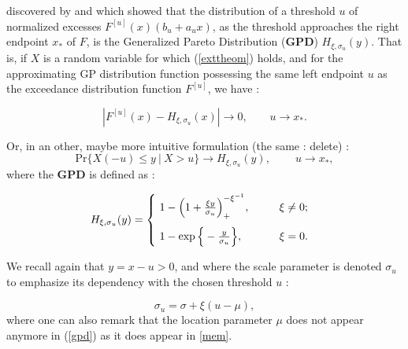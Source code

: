 \begin{theorem}
	discovered by \emph{\cite{balkema_residual_1974}} and\emph{\cite{iii_statistical_1975-1}}
	which showed that the distribution of a threshold $u$ of normalized excesses $F^{[u]}(x)(b_u+a_ux)$, as the threshold approaches the right endpoint $x_*$ of $F$, is the Generalized Pareto Distribution (\textbf{GPD}) $H_{\xi,\sigma_u}(y)$. That is, if $X$ is a random variable for which (\ref{exttheom}) holds, and for the approximating GP distribution function possessing the same left endpoint $u$ as the exceedance distribution function $F^{[u]}$, we have \emph{\citet[pp.27]{reiss_statistical_2007}}: 
	
	\begin{equation*}
	|F^{[u]}(x)-H_{\xi,\sigma_u}(x)|\longrightarrow 0, \ \ \ \ \ \ \ \ \ u\to x_*.
	\end{equation*}
\end{theorem}
Or, in an other, maybe more intuitive formulation (the same : delete) \cite{coles_introduction_2001} :
\begin{equation} \label{gpdconv}
\text{Pr}\big\{X(-u)\leq y\ |\ X>u\big\}\longrightarrow H_{\xi,\sigma_u}(y), \ \ \ \ \ \ \ \ \ \ u\to x_*,
\end{equation}
where the \textbf{GPD} is defined as :


\begin{equation}\label{gpdeq}
H_{\xi,\sigma_u}(y)=
\renewcommand{\arraystretch}{0.6}\left\{\begin{array}{@{}l@{\quad}l@{}}
\ 1-\Big(1+\frac{\xi y}{\sigma_u}\Big)_+^{-\xi^{-1}}, \ \ \ \ \ \  \ \ \xi\neq 0; \\ 
\vspace{0.0002cm} \\
\ 1-\exp\Big\{-\frac{y}{\sigma_u}\Big\}, \ \ \ \ \ \ \ \ \ \ \xi=0.

\end{array}\right.\kern-\nulldelimiterspace
\end{equation}


We recall again that $y = x-u >0$, and where the scale parameter is denoted $\sigma_u$ to emphasize its dependency with the chosen threshold $u$ :

\begin{equation}
\sigma_{u}=\sigma+\xi (u-\mu),
\end{equation}
where one can also remark that the location parameter $\mu$ does not appear anymore in (\ref{gpd}) as it does appear in \ref{mem}. 

